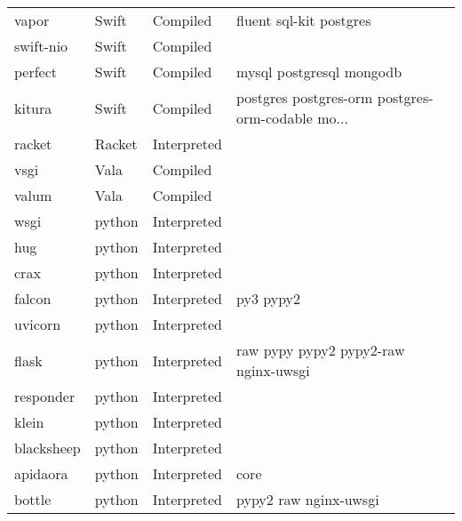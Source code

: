 \begin{longtable}{llll}
    vapor            & Swift       & Compiled    & fluent sql-kit postgres                            \\
    swift-nio        & Swift       & Compiled    &                                                    \\
    perfect          & Swift       & Compiled    & mysql postgresql mongodb                           \\
    kitura           & Swift       & Compiled    & postgres postgres-orm postgres-orm-codable mo...   \\
    racket           & Racket      & Interpreted &                                                    \\
    vsgi             & Vala        & Compiled    &                                                    \\
    valum            & Vala        & Compiled    &                                                    \\
    wsgi             & python      & Interpreted &                                                    \\
    hug              & python      & Interpreted &                                                    \\
    crax             & python      & Interpreted &                                                    \\
    falcon           & python      & Interpreted & py3 pypy2                                          \\
    uvicorn          & python      & Interpreted &                                                    \\
    flask            & python      & Interpreted & raw pypy pypy2 pypy2-raw nginx-uwsgi               \\
    responder        & python      & Interpreted &                                                    \\
    klein            & python      & Interpreted &                                                    \\
    blacksheep       & python      & Interpreted &                                                    \\
    apidaora         & python      & Interpreted & core                                               \\
    bottle           & python      & Interpreted & pypy2 raw nginx-uwsgi                              \\

\end{longtable}
